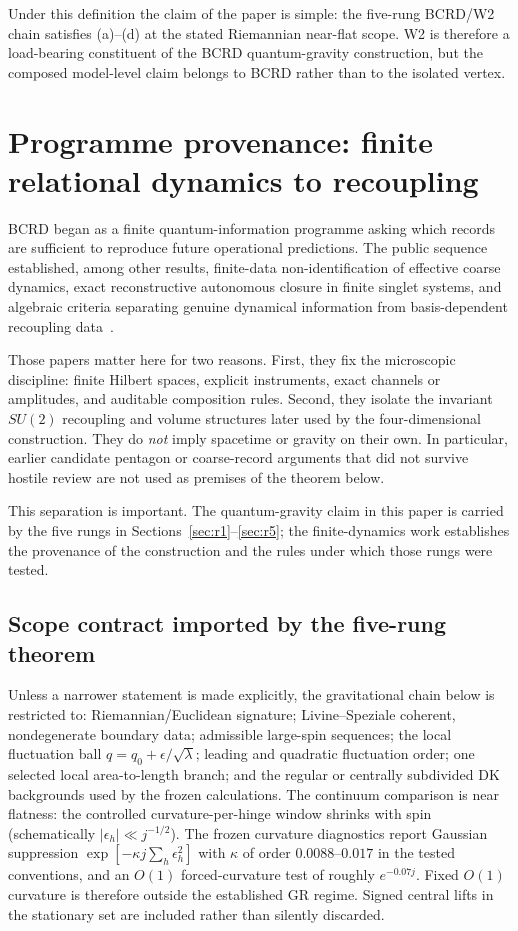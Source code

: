 \documentclass[11pt]{article}
\numberwithin{equation}{section}
\newcommand{\SUtwo}{SU(2)}
\begin{document}
Under this definition the claim of the paper is simple: the five-rung BCRD/W2 chain satisfies (a)--(d) at the stated Riemannian near-flat scope. W2 is therefore a load-bearing constituent of the BCRD quantum-gravity construction, but the composed model-level claim belongs to BCRD rather than to the isolated vertex.

\section{Programme provenance: finite relational dynamics to recoupling}

BCRD began as a finite quantum-information programme asking which records are sufficient to reproduce future operational predictions. The public sequence established, among other results, finite-data non-identification of effective coarse dynamics, exact reconstructive autonomous closure in finite singlet systems, and algebraic criteria separating genuine dynamical information from basis-dependent recoupling data~\cite{BCRDarchive}.

Those papers matter here for two reasons. First, they fix the microscopic discipline: finite Hilbert spaces, explicit instruments, exact channels or amplitudes, and auditable composition rules. Second, they isolate the invariant $\SUtwo$ recoupling and volume structures later used by the four-dimensional construction. They do \emph{not} imply spacetime or gravity on their own. In particular, earlier candidate pentagon or coarse-record arguments that did not survive hostile review are not used as premises of the theorem below.

This separation is important. The quantum-gravity claim in this paper is carried by the five rungs in Sections~\ref{sec:r1}--\ref{sec:r5}; the finite-dynamics work establishes the provenance of the construction and the rules under which those rungs were tested.

\subsection*{Scope contract imported by the five-rung theorem}
Unless a narrower statement is made explicitly, the gravitational chain below is restricted to: Riemannian/Euclidean signature; Livine--Speziale coherent, nondegenerate boundary data; admissible large-spin sequences; the local fluctuation ball $q=q_0+\epsilon/\sqrt\lambda$; leading and quadratic fluctuation order; one selected local area-to-length branch; and the regular or centrally subdivided DK backgrounds used by the frozen calculations. The continuum comparison is near flatness: the controlled curvature-per-hinge window shrinks with spin (schematically $|\epsilon_h|\ll j^{-1/2}$). The frozen curvature diagnostics report Gaussian suppression $\exp[-\kappa j\sum_h\epsilon_h^2]$ with $\kappa$ of order $0.0088$--$0.017$ in the tested conventions, and an $O(1)$ forced-curvature test of roughly $e^{-0.07j}$. Fixed $O(1)$ curvature is therefore outside the established GR regime. Signed central lifts in the stationary set are included rather than silently discarded.
\end{document}
